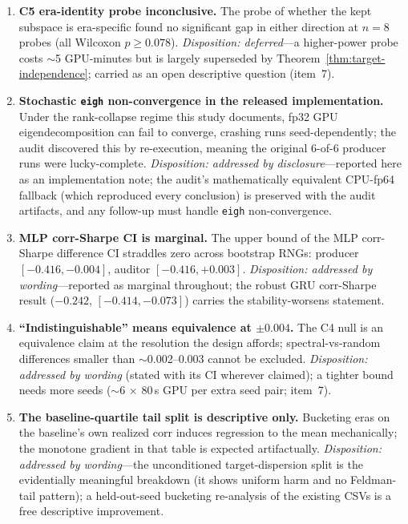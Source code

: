 \begin{enumerate}
{    future work} with a small resource ask ($\sim$10 GPU-minutes for a
    $\leq$4-trial tuning-block sweep plus re-run; item~7)---not
    claim-critical, since a better-tuned baseline would likely strengthen
    the negative, and the under-tuned-spectral direction is already covered
    by the F12 wording.
  \item \textbf{C5 era-identity probe inconclusive.} The probe of whether
    the kept subspace is era-specific found no significant gap in either
    direction at $n{=}8$ probes (all Wilcoxon $p \geq 0.078$).
    \emph{Disposition: deferred}---a higher-power probe costs $\sim$5
    GPU-minutes but is largely superseded by
    Theorem~\ref{thm:target-independence}; carried as an open descriptive
    question (item~7).
  \item \textbf{Stochastic \texttt{eigh} non-convergence in the released
    implementation.} Under the rank-collapse regime this study documents,
    fp32 GPU eigendecomposition can fail to converge, crashing runs
    seed-dependently; the audit discovered this by re-execution, meaning
    the original 6-of-6 producer runs were lucky-complete.
    \emph{Disposition: addressed by disclosure}---reported here as an
    implementation note; the audit's mathematically equivalent CPU-fp64
    fallback (which reproduced every conclusion) is preserved with the
    audit artifacts, and any follow-up must handle \texttt{eigh}
    non-convergence.
  \item \textbf{MLP corr-Sharpe CI is marginal.} The upper bound of the MLP
    corr-Sharpe difference CI straddles zero across bootstrap RNGs:
    producer $[-0.416, -0.004]$, auditor $[-0.416, +0.003]$.
    \emph{Disposition: addressed by wording}---reported as marginal
    throughout; the robust GRU corr-Sharpe result ($-0.242$,
    $[-0.414, -0.073]$) carries the stability-worsens statement.
  \item \textbf{``Indistinguishable'' means equivalence at $\pm 0.004$.}
    The C4 null is an equivalence claim at the resolution the design
    affords; spectral-vs-random differences smaller than
    $\sim$0.002--0.003 cannot be excluded. \emph{Disposition: addressed by
    wording} (stated with its CI wherever claimed); a tighter bound needs
    more seeds ($\sim$6 $\times$ 80\,s GPU per extra seed pair; item~7).
  \item \textbf{The baseline-quartile tail split is descriptive only.}
    Bucketing eras on the baseline's own realized corr induces regression
    to the mean mechanically; the monotone gradient in that table is
    expected artifactually. \emph{Disposition: addressed by
    wording}---the unconditioned target-dispersion split is the
    evidentially meaningful breakdown (it shows uniform harm and no
    Feldman-tail pattern); a held-out-seed bucketing re-analysis of the
    existing CSVs is a free descriptive improvement.
\end{enumerate}

